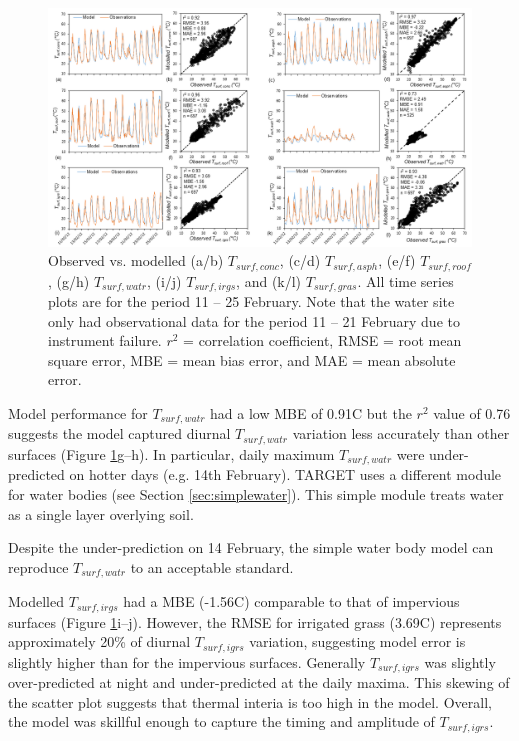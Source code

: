 \documentclass[gmd, manuscript]{copernicus}
\begin{document}
\begin{figure}
\includegraphics[width=1\textwidth]{figure4.png}
\caption{Observed vs. modelled (a/b) $T_{surf,conc}$, (c/d) $ T_{surf,asph}$, (e/f) $T_{surf,roof}$, (g/h) $T_{surf,watr}$, (i/j) $T_{surf,irgs}$, and (k/l)  $T_{surf,gras}$. All time series plots are for the period 11 -- 25 February. Note that the water site only had observational data for the period 11 -- 21 February due to instrument failure. $r^{2}$ = correlation coefficient, RMSE = root mean square error, MBE = mean bias error, and MAE = mean absolute error. }\label{fig:Tsurf_panel}
\end{figure}




Model performance for  $T_{surf,watr}$ had a low MBE of 0.91\degree C but the $r^{2}$ value of 0.76 suggests the model captured diurnal $T_{surf,watr}$  variation less accurately than other surfaces (Figure \ref{fig:Tsurf_panel}g--h). In particular, daily maximum $T_{surf,watr}$ were under-predicted on hotter days (e.g. 14th February). TARGET uses a different module for water bodies (see Section \ref{sec:simplewater}). This simple module treats water as a single layer overlying soil. 
  
Despite the under-prediction on 14 February, the simple water body model can reproduce  $T_{surf,watr}$ to an acceptable standard. 

Modelled $T_{surf,irgs}$ had a MBE (-1.56\degree C) comparable to that of impervious surfaces (Figure \ref{fig:Tsurf_panel}i--j). However, the RMSE for irrigated grass (3.69\degree C) represents approximately 20\% of diurnal $T_{surf,igrs}$ variation, suggesting model error is slightly higher than for the impervious surfaces. Generally  $T_{surf,igrs}$ was slightly over-predicted at night  and under-predicted at the daily maxima. This skewing of the scatter plot suggests that thermal interia is too high in the model. Overall, the model was skillful enough to capture the timing and amplitude of  $T_{surf,igrs}$. 
\end{document}

